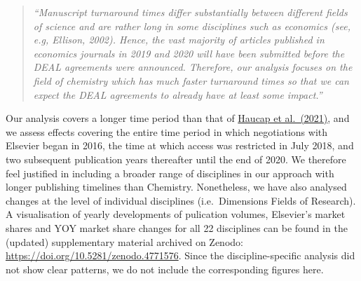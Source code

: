 \documentclass[
]{article}
\begin{document}
\begin{quote}
\emph{``Manuscript turnaround times differ substantially between different fields of science and are rather long in some disciplines such as economics (see, e.g, Ellison, 2002). Hence, the vast majority of articles published in economics journals in 2019 and 2020 will have been submitted before the DEAL agreements were announced. Therefore, our analysis focuses on the field of chemistry which has much faster turnaround times so that we can expect the DEAL agreements to already have at least some impact.''}
\end{quote}

Our analysis covers a longer time period than that of \href{https://www.cesifo.org/en/publikationen/2021/working-paper/impact-german-deal-competition-academic-publishing-market}{Haucap et al.~(2021)}, and we assess effects covering the entire time period in which negotiations with Elsevier began in 2016, the time at which access was restricted in July 2018, and two subsequent publication years thereafter until the end of 2020. We therefore feel justified in including a broader range of disciplines in our approach with longer publishing timelines than Chemistry. Nonetheless, we have also analysed changes at the level of individual disciplines (i.e.~Dimensions Fields of Research). A visualisation of yearly developments of pulication volumes, Elsevier's market shares and YOY market share changes for all 22 disciplines can be found in the (updated) supplementary material archived on Zenodo: \url{https://doi.org/10.5281/zenodo.4771576}. Since the discipline-specific analysis did not show clear patterns, we do not include the corresponding figures here.
\end{document}
